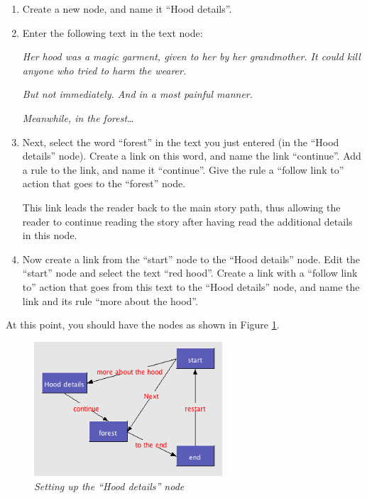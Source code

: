 \documentclass{article}
\begin{document}
\begin{enumerate}
  \item Create a new node, and name it ``Hood details''.
  \item Enter the following text in the text node:

\textit{Her hood was a magic garment, given to her by her grandmother.
It could kill anyone who tried to harm the wearer.}

\textit{But not immediately. And in a most painful manner.}

\textit{Meanwhile, in the forest\ldots}

\item Next, select the word ``forest'' in the text you just entered (in the
``Hood details'' node). Create a link on this word, and name the link
``continue''. Add a rule to the link, and name it ``continue''. Give the rule a
``follow link to'' action that goes to the ``forest'' node.

This link leads the reader back to the main story path, thus allowing the
reader to continue reading the story after having read the additional details in
this node.

\item Now create a link from the ``start'' node to the ``Hood details'' node.
Edit the ``start'' node and select the text ``red hood''. Create a link with a
``follow link to'' action that goes from this text to the ``Hood details'' node,
and name the link and its rule ``more about the hood''.
\end{enumerate}

At this point, you should have the nodes as shown in Figure
\ref{fig:setting_up_hood_details}.

 
\begin{figure}[ht]
  \centering
  \includegraphics[width=7cm]{images/hypedyn-tutorial-1-figure-12}
  \caption{\textit{Setting up the ``Hood details'' node}}
  \label{fig:setting_up_hood_details}
\end{figure} 
\end{document}
